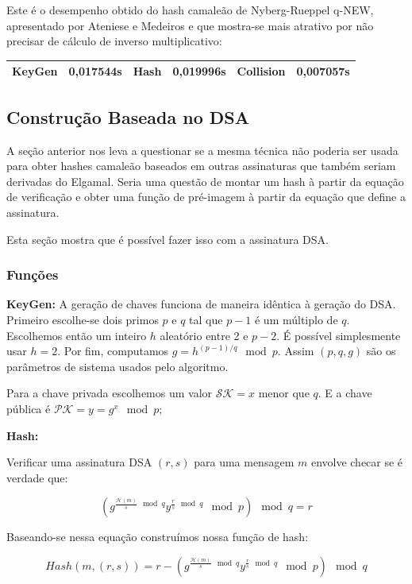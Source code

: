 \documentclass[a4paper]{article}
\begin{document}
Este é o desempenho obtido do hash camaleão de Nyberg-Rueppel q-NEW,
apresentado por Ateniese e Medeiros e que mostra-se mais atrativo por
não precisar de cálculo de inverso multiplicativo:

\begin{center}
\begin{tabular}{|c|c|c|c|c|c|}
  \hline
  KeyGen & 0,017544s & Hash & 0,019996s & Collision & 0,007057s\\
  \hline
\end{tabular}
\end{center}

\subsection{Construção Baseada no DSA}

A seção anterior nos leva a questionar se a mesma técnica não poderia
ser usada para obter hashes camaleão baseados em outras assinaturas
que também seriam derivadas do Elgamal. Seria uma questão de montar um
hash à partir da equação de verificação e obter uma função de
pré-imagem à partir da equação que define a assinatura.

Esta seção mostra que é possível fazer isso com a assinatura DSA.

\subsubsection{Funções}

\textbf{KeyGen: } A geração de chaves funciona de maneira idêntica à
geração do DSA. Primeiro escolhe-se dois primos $p$ e $q$ tal que
$p-1$ é um múltiplo de $q$. Escolhemos então um inteiro $h$ aleatório
entre 2 e $p-2$. É possível simplesmente usar $h=2$. Por fim,
computamos $g=h^{(p-1)/q} \mod p$. Assim $(p, q, g)$ são os parâmetros
de sistema usados pelo algoritmo.

Para a chave privada escolhemos um valor $\mathcal{SK}=x$ menor que
$q$. E a chave pública é $\mathcal{PK}=y=g^x \mod p$;

\textbf{Hash:}

Verificar uma assinatura DSA $(r, s)$ para uma mensagem $m$ envolve
checar se é verdade que:

$$
(g^{\frac{\mathcal{H}(m)}{s} \mod q}y^{\frac{r}{s} \mod q} \mod p) \mod q = r
$$

Baseando-se nessa equação construímos nossa função de hash:

$$
Hash(m, (r, s)) = r - (g^{\frac{\mathcal{H}(m)}{s} \mod q}y^{\frac{r}{s} \mod q} \mod p) \mod q
$$
\end{document}
